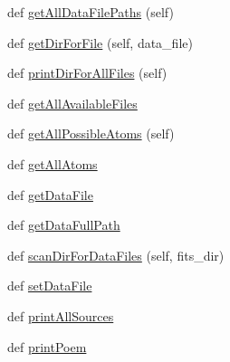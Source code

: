 \begin{DoxyCompactItemize}
def \hyperlink{classpyneb_1_1utils_1_1manage__atomic__data_1_1___manage_atomic_data_ac59cfda1b15dee520f74603188a92100}{get\+All\+Data\+File\+Paths} (self)
\item 
def \hyperlink{classpyneb_1_1utils_1_1manage__atomic__data_1_1___manage_atomic_data_ac7cc868181a4cbe6e25dac7df8d89529}{get\+Dir\+For\+File} (self, data\+\_\+file)
\item 
def \hyperlink{classpyneb_1_1utils_1_1manage__atomic__data_1_1___manage_atomic_data_a321acec83321759f87c71f3fb5b8ec84}{print\+Dir\+For\+All\+Files} (self)
\item 
def \hyperlink{classpyneb_1_1utils_1_1manage__atomic__data_1_1___manage_atomic_data_a5dde49093e5ea51b38a8ae9899da8aea}{get\+All\+Available\+Files}
\item 
def \hyperlink{classpyneb_1_1utils_1_1manage__atomic__data_1_1___manage_atomic_data_aee697008d2e8858896edb0ae3b3721a9}{get\+All\+Possible\+Atoms} (self)
\item 
def \hyperlink{classpyneb_1_1utils_1_1manage__atomic__data_1_1___manage_atomic_data_a497c91f5f95599e5a0f11c458e7ed465}{get\+All\+Atoms}
\item 
def \hyperlink{classpyneb_1_1utils_1_1manage__atomic__data_1_1___manage_atomic_data_a610d0359f8255dfcb1bac0c5435e6d8c}{get\+Data\+File}
\item 
def \hyperlink{classpyneb_1_1utils_1_1manage__atomic__data_1_1___manage_atomic_data_a3aaadd93c7f53149434cf05fc661f49b}{get\+Data\+Full\+Path}
\item 
def \hyperlink{classpyneb_1_1utils_1_1manage__atomic__data_1_1___manage_atomic_data_aa47c0050e7f9e2553506cf5a76a9c144}{scan\+Dir\+For\+Data\+Files} (self, fits\+\_\+dir)
\item 
def \hyperlink{classpyneb_1_1utils_1_1manage__atomic__data_1_1___manage_atomic_data_af2354c03cd32b44c4e21e3d1111f50bf}{set\+Data\+File}
\item 
def \hyperlink{classpyneb_1_1utils_1_1manage__atomic__data_1_1___manage_atomic_data_a4b497e5f0b4eb36b104a866a4db487b5}{print\+All\+Sources}
\item 
def \hyperlink{classpyneb_1_1utils_1_1manage__atomic__data_1_1___manage_atomic_data_a18f443445e62441ab243fe3cc77cee4a}{print\+Poem}
\end{DoxyCompactItemize}
